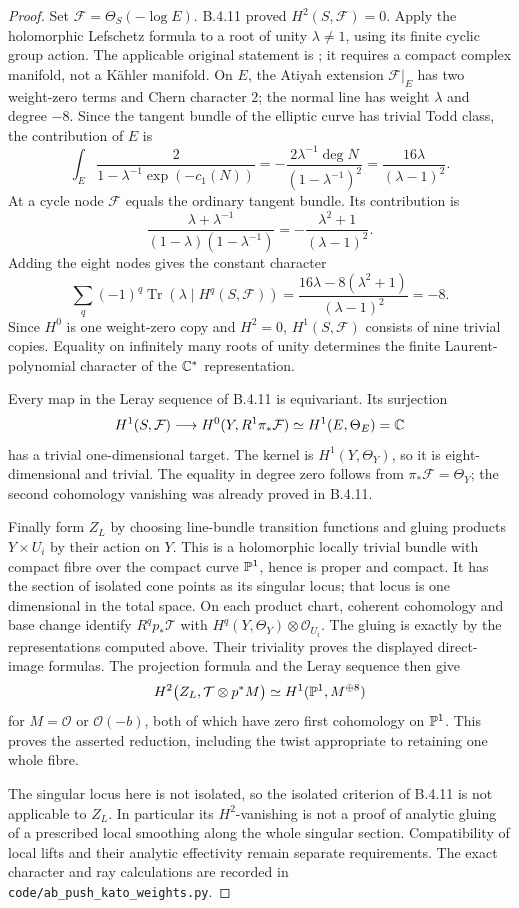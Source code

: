 \begin{proof}
Set $\mathcal F=\Theta_S(-\log E)$.
B.4.11 proved $H^2(S,\mathcal F)=0$.
Apply the holomorphic Lefschetz formula to a root of unity
$\lambda\ne1$, using its finite cyclic group action.
The applicable original statement is
\citet[Theorem~(4.6), p.~566]{AtiyahSinger1968IIIE}; it requires
a compact complex manifold, not a K\"ahler manifold.
On $E$, the Atiyah extension $\mathcal F|_E$ has two
weight-zero terms and Chern character $2$; the normal line
has weight $\lambda$ and degree $-8$.
Since the tangent bundle of the elliptic curve has trivial
Todd class, the contribution of $E$ is
\[
 \int_E\frac{2}{1-\lambda^{-1}\exp(-c_1(N))}
   =-\frac{2\lambda^{-1}\deg N}
           {(1-\lambda^{-1})^2}
   =\frac{16\lambda}{(\lambda-1)^2}.
\]
At a cycle node $\mathcal F$ equals the ordinary tangent
bundle.  Its contribution is
\[
 \frac{\lambda+\lambda^{-1}}
      {(1-\lambda)(1-\lambda^{-1})}
   =-\frac{\lambda^2+1}{(\lambda-1)^2}.
\]
Adding the eight nodes gives the constant character
\[
 \sum_q(-1)^q\operatorname{Tr}
       (\lambda\mid H^q(S,\mathcal F))
 =\frac{16\lambda-8(\lambda^2+1)}{(\lambda-1)^2}
 =-8.
\]
Since $H^0$ is one weight-zero copy and $H^2=0$,
$H^1(S,\mathcal F)$ consists of nine trivial copies.
Equality on infinitely many roots of unity determines the
finite Laurent-polynomial character of the $\mathbb C^*$ representation.

Every map in the Leray sequence of B.4.11 is equivariant.
Its surjection
\[
 H^1(S,\mathcal F)\longrightarrow
 H^0(Y,R^1\pi_*\mathcal F)
       \simeq H^1(E,\Theta_E)=\mathbb C
\]
has a trivial one-dimensional target.
The kernel is $H^1(Y,\Theta_Y)$, so it is eight-dimensional
and trivial.  The equality in degree zero follows from
$\pi_*\mathcal F=\Theta_Y$; the second cohomology vanishing
was already proved in B.4.11.

Finally form $Z_L$ by choosing line-bundle transition functions
and gluing products $Y\times U_i$ by their action on $Y$.
This is a holomorphic locally trivial bundle with compact
fibre over the compact curve $\mathbb P^1$, hence is proper and
compact.  It has the section of isolated cone points as its
singular locus; that locus is one dimensional in the total
space.  On each product chart, coherent cohomology and base
change identify $R^qp_*\mathcal T$ with
$H^q(Y,\Theta_Y)\otimes\mathcal O_{U_i}$.
The gluing is exactly by the representations computed above.
Their triviality proves the displayed direct-image formulas.
The projection formula and the Leray sequence then give
\[
 H^2\bigl(Z_L,\mathcal T\otimes p^*M\bigr)
      \simeq H^1(\mathbb P^1,M^{\oplus8})
\]
for $M=\mathcal O$ or $\mathcal O(-b)$, both of which have
zero first cohomology on $\mathbb P^1$.
This proves the asserted reduction, including the twist
appropriate to retaining one whole fibre.

The singular locus here is not isolated, so the isolated
criterion of B.4.11 is not applicable to $Z_L$.
In particular its $H^2$-vanishing is not a proof of analytic
gluing of a prescribed local smoothing along the whole
singular section.  Compatibility of local lifts and their
analytic effectivity remain separate requirements.
The exact character and ray calculations are recorded in
\texttt{code/ab\_push\_kato\_weights.py}.
\end{proof}
